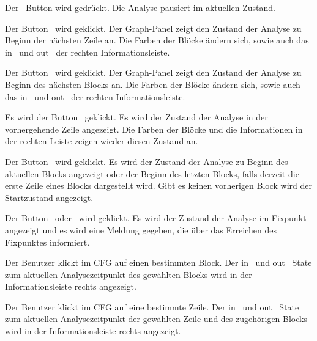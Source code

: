 {Der \faPause\ Button wird gedrückt.}
{Die Analyse pausiert im aktuellen Zustand.}

{Der Button \faForward\ wird geklickt.}
{Der Graph-Panel zeigt den Zustand der Analyse zu Beginn der nächsten Zeile an. Die Farben der Blöcke ändern sich, sowie auch das \glqq in \grqq\ und \glqq out \grqq\ der rechten Informationsleiste.}

{Der Button \faFastForward\ wird geklickt.}
{Der Graph-Panel zeigt den Zustand der Analyse zu Beginn des nächsten Blocks an. Die Farben der Blöcke ändern sich, sowie auch das \glqq in \grqq\ und \glqq out \grqq\ der rechten Informationsleiste.}

{Es wird der Button \faBackward\ geklickt.}
{Es wird der Zustand der Analyse in der vorhergehende Zeile angezeigt. Die Farben der Blöcke und die Informationen in der rechten Leiste zeigen wieder diesen Zustand an.}

{Der Button \faFastBackward\ wird geklickt.}
{Es wird der Zustand der Analyse zu Beginn des aktuellen Blocks angezeigt oder der Beginn des letzten Blocks, falls derzeit die erste Zeile eines Blocks dargestellt wird. Gibt es keinen vorherigen Block wird der Startzustand angezeigt.}

{Der Button \faForward\ oder \faFastForward\ wird geklickt.}
{Es wird der Zustand der Analyse im Fixpunkt angezeigt und es wird eine Meldung gegeben, die über das Erreichen des Fixpunktes informiert.}



{Der Benutzer klickt im CFG auf einen bestimmten Block.}
{Der \glqq in \grqq\ und \glqq out \grqq\ State zum aktuellen Analysezeitpunkt des gewählten Blocks wird in der Informationsleiste rechts angezeigt.}

{Der Benutzer klickt im CFG auf eine bestimmte Zeile.}
{Der \glqq in \grqq\ und \glqq out \grqq\ State zum aktuellen Analysezeitpunkt der gewählten Zeile und des zugehörigen Blocks wird in der Informationsleiste rechts angezeigt.}

